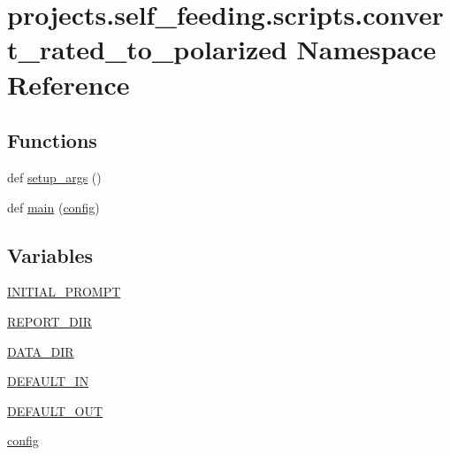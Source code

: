 \hypertarget{namespaceprojects_1_1self__feeding_1_1scripts_1_1convert__rated__to__polarized}{}\section{projects.\+self\+\_\+feeding.\+scripts.\+convert\+\_\+rated\+\_\+to\+\_\+polarized Namespace Reference}
\label{namespaceprojects_1_1self__feeding_1_1scripts_1_1convert__rated__to__polarized}
\subsection*{Functions}
\begin{DoxyCompactItemize}
\item 
def \hyperlink{namespaceprojects_1_1self__feeding_1_1scripts_1_1convert__rated__to__polarized_acba2c1088cdc95f703203c9166b9499d}{setup\+\_\+args} ()
\item 
def \hyperlink{namespaceprojects_1_1self__feeding_1_1scripts_1_1convert__rated__to__polarized_abb1b1c7522da8d4703fc74cdb6422d87}{main} (\hyperlink{namespaceprojects_1_1self__feeding_1_1scripts_1_1convert__rated__to__polarized_a6caf02831bff7f048ef8755cfa97c477}{config})
\end{DoxyCompactItemize}
\subsection*{Variables}
\begin{DoxyCompactItemize}
\item 
\hyperlink{namespaceprojects_1_1self__feeding_1_1scripts_1_1convert__rated__to__polarized_a31d237eba6c7ad7903f930c1e58f8102}{I\+N\+I\+T\+I\+A\+L\+\_\+\+P\+R\+O\+M\+PT}
\item 
\hyperlink{namespaceprojects_1_1self__feeding_1_1scripts_1_1convert__rated__to__polarized_a6028adaa8a7b30cc2fba04ad49eee0ac}{R\+E\+P\+O\+R\+T\+\_\+\+D\+IR}
\item 
\hyperlink{namespaceprojects_1_1self__feeding_1_1scripts_1_1convert__rated__to__polarized_ab364c3f1ce755978deef3d5342c64067}{D\+A\+T\+A\+\_\+\+D\+IR}
\item 
\hyperlink{namespaceprojects_1_1self__feeding_1_1scripts_1_1convert__rated__to__polarized_a1fb0d87725f69230703cb6ad84e91540}{D\+E\+F\+A\+U\+L\+T\+\_\+\+IN}
\item 
\hyperlink{namespaceprojects_1_1self__feeding_1_1scripts_1_1convert__rated__to__polarized_abb1116b353d5144f1b345189b671b368}{D\+E\+F\+A\+U\+L\+T\+\_\+\+O\+UT}
\item 
\hyperlink{namespaceprojects_1_1self__feeding_1_1scripts_1_1convert__rated__to__polarized_a6caf02831bff7f048ef8755cfa97c477}{config}
\end{DoxyCompactItemize}


